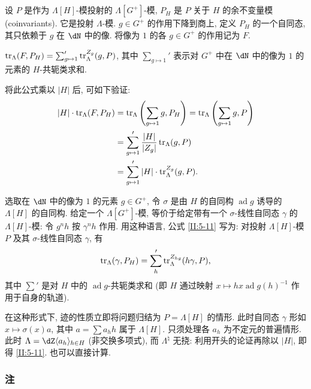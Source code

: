 \subsection{}\label{II:5-10}

设 $P$ 是作为 $\Lambda[H]$-模投射的 $\Lambda[G^+]$-模, $P_H$ 是 $P$ 关于 $H$ 的余不变量模 (coinvariants). 它是投射 $\Lambda$-模. $g\in G^+$ 的作用下降到商上, 定义 $P_H$ 的一个自同态, 其只依赖于 $g$ 在 $\dN$ 中的像. 将像为 $1$ 的各 $g\in G^+$ 的作用记为 $F$.

\begin{proposition_}\label{II:5-11}
$\operatorname{tr}_\Lambda(F,P_H) = \sum_{g\mapsto 1}' \operatorname{tr}_\Lambda^{Z_g}(g,P)$, 其中 $\sum_{g\mapsto 1}'$ 表示对 $G^+$ 中在 $\dN$ 中的像为 $1$ 的元素的 $H$-共轭类求和.
\end{proposition_}

将此公式乘以 $|H|$ 后, 可如下验证:
\begin{align*}
  |H|\cdot \operatorname{tr}_\Lambda(F,P_H)
    &= \operatorname{tr}_\Lambda\left(\sum_{g\mapsto 1} g,P_H\right)
     = \operatorname{tr}_\Lambda\left(\sum_{g\mapsto 1} g,P\right) \\
    &= \sum_{g\mapsto 1}' \frac{|H|}{|Z_g|}\operatorname{tr}_\Lambda(g,P) \\
    &= \sum_{g\mapsto 1}' |H|\cdot \operatorname{tr}_\Lambda^{Z_g}(g,P) \text{.}
\end{align*}

选取在 $\dN$ 中的像为 $1$ 的元素 $g\in G^+$, 令 $\sigma$ 是由 $H$ 的自同构 $\operatorname{ad} g$ 诱导的 $\Lambda[H]$ 的自同构. 给定一个 $\Lambda[G^+]$-模, 等价于给定带有一个 $\sigma$-线性自同态 $\gamma$ 的 $\Lambda[H]$-模: 令 $g^n h$ 按 $\gamma^n h$ 作用. 用这种语言, 公式 \ref{II:5-11} 写为: 对投射 $\Lambda[H]$-模 $P$ 及其 $\sigma$-线性自同态 $\gamma$, 有
\[
  \operatorname{tr}_\Lambda(\gamma,P_H) = \sum_h' \operatorname{tr}_\Lambda^{Z_{hg}}(h\gamma,P)\text{,}
\]
其中 $\sum'$ 是对 $H$ 中的 $\operatorname{ad}g$-共轭类求和 (即 $H$ 通过映射 $x\mapsto h x \operatorname{ad} g(h)^{-1}$ 作用于自身的轨道).

在这种形式下, 迹的性质立即将问题归结为 $P=\Lambda[H]$ 的情形. 此时自同态 $\gamma$ 形如 $x\mapsto \sigma(x) a$, 其中 $a=\sum a_h h$ 属于 $\Lambda[H]$. 只须处理各 $a_h$ 为不定元的普遍情形. 此时 $\Lambda=\dZ\langle a_h\rangle_{h\in H}$ (非交换多项式), 而 $\Lambda^\natural$ 无挠: 利用开头的论证再除以 $|H|$, 即得 \ref{II:5-11}. 也可以直接计算.

\subsubsection{注}\label{II:5-11-1}

